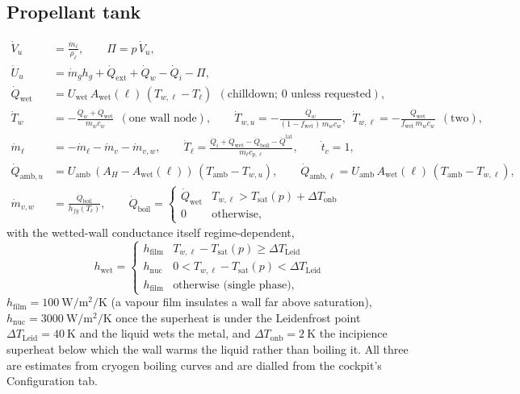 \documentclass[11pt,a4paper]{article}
\newcommand{\mdot}{\dot{m}}
\newcommand{\Qdot}{\dot{Q}}
\begin{document}
\subsection{Propellant tank}
\begin{align}
  \dot V_u &= \frac{\mdot_\ell}{\rho_\ell},\qquad \Pi = p\,\dot V_u,\\
  \dot U_u &= \mdot_g h_g + \Qdot_{\mathrm{ext}} + \Qdot_w - \Qdot_i - \Pi, \label{eq:ullage}\\
  \Qdot_{\mathrm{wet}} &= U_{\mathrm{wet}}\,A_{\mathrm{wet}}(\ell)\,(T_{w,\ell} - T_\ell)\ \ (\text{chilldown; 0 unless requested}),\label{eq:chilldown}\\
  \dot T_w &= -\frac{\Qdot_w + \Qdot_{\mathrm{wet}}}{m_wc_w}\ \ (\text{one wall node}),\qquad
  \dot T_{w,u} = -\frac{\Qdot_w}{(1-f_{\mathrm{wet}})\,m_wc_w},\ \ 
  \dot T_{w,\ell} = -\frac{\Qdot_{\mathrm{wet}}}{f_{\mathrm{wet}}\,m_wc_w}\ \ (\text{two}),\label{eq:twowall}\\
  \dot m_\ell &= -\mdot_\ell - \mdot_v - \mdot_{v,w},\qquad
  \dot T_\ell = \frac{\Qdot_i + \Qdot_{\mathrm{wet}} - \Qdot_{\mathrm{boil}} - \Qdot^{\mathrm{lat}}}{m_\ell c_{p,\ell}},\qquad
  \dot t_c = 1,\\
  \Qdot_{\mathrm{amb},u} &= U_{\mathrm{amb}}\,(A_H - A_{\mathrm{wet}}(\ell))\,(T_{\mathrm{amb}}-T_{w,u}),\qquad
  \Qdot_{\mathrm{amb},\ell} = U_{\mathrm{amb}}\,A_{\mathrm{wet}}(\ell)\,(T_{\mathrm{amb}}-T_{w,\ell}),\label{eq:leak}\\
  \mdot_{v,w} &= \frac{\Qdot_{\mathrm{boil}}}{h_{fg}(T_\ell)},\qquad
  \Qdot_{\mathrm{boil}} = \begin{cases}\Qdot_{\mathrm{wet}} & T_{w,\ell} > T_{\mathrm{sat}}(p) + \Delta T_{\mathrm{onb}}\\ 0 & \text{otherwise},\end{cases}\label{eq:wallboil}
\end{align}
with the wetted-wall conductance itself regime-dependent,
\begin{equation}
  h_{\mathrm{wet}} = \begin{cases} h_{\mathrm{film}} & T_{w,\ell} - T_{\mathrm{sat}}(p) \ge \Delta T_{\mathrm{Leid}} \\ h_{\mathrm{nuc}} & 0 < T_{w,\ell} - T_{\mathrm{sat}}(p) < \Delta T_{\mathrm{Leid}} \\ h_{\mathrm{film}} & \text{otherwise (single phase)},\end{cases}
  \label{eq:regimes}
\end{equation}
$h_{\mathrm{film}}=\SI{100}{\watt\per\square\metre\per\kelvin}$ (a vapour film
insulates a wall far above saturation), $h_{\mathrm{nuc}}=\SI{3000}{\watt\per\square\metre\per\kelvin}$
once the superheat is under the Leidenfrost point $\Delta T_{\mathrm{Leid}}=\SI{40}{\kelvin}$
and the liquid wets the metal, and $\Delta T_{\mathrm{onb}}=\SI{2}{\kelvin}$ the incipience
superheat below which the wall warms the liquid rather than boiling it. All three
are estimates from cryogen boiling curves and are dialled from the cockpit's
Configuration tab.
\end{document}
